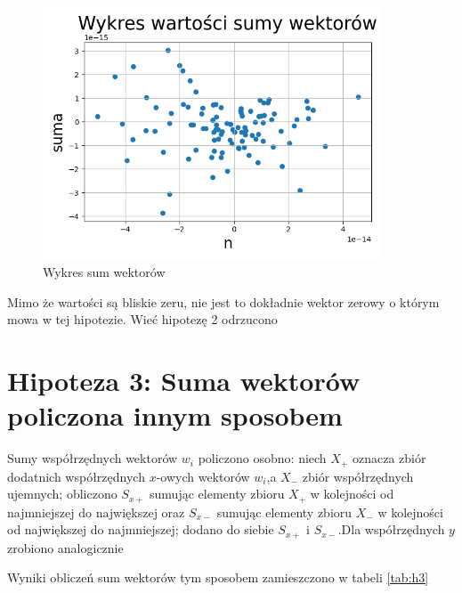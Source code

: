 \documentclass[12pt,a4paper]{article}
\begin{document}
\begin{figure}[!htb]
    \centering
        \centering
        \includegraphics[width=10cm]{images/h2.png}
        \caption{Wykres sum wektorów}
        \label{fig:h2}
\end{figure}

Mimo że wartości są bliskie zeru, nie jest to dokładnie wektor zerowy o którym mowa w tej hipotezie. Wieć hipotezę 2 odrzucono

\newpage

\section{Hipoteza 3: Suma wektorów policzona innym sposobem}

Sumy współrzędnych wektorów $w_{i}$ policzono osobno: niech $X_{+}$ oznacza zbiór dodatnich współrzędnych $x$-owych wektorów $w_{i}$,a $X_{-}$ zbiór współrzędnych ujemnych; obliczono $S_{x+}$ sumując elementy zbioru $X_{+}$ w kolejności od najmniejszej do największej oraz $S_{x-}$ sumując elementy zbioru $X_{-}$ w kolejności od największej do najmniejszej; dodano do siebie $S_{x+}$ i $S_{x-}$.Dla współrzędnych $y$ zrobiono analogicznie


Wyniki obliczeń sum wektorów tym sposobem zamieszczono w tabeli \ref{tab:h3}
\end{document}
